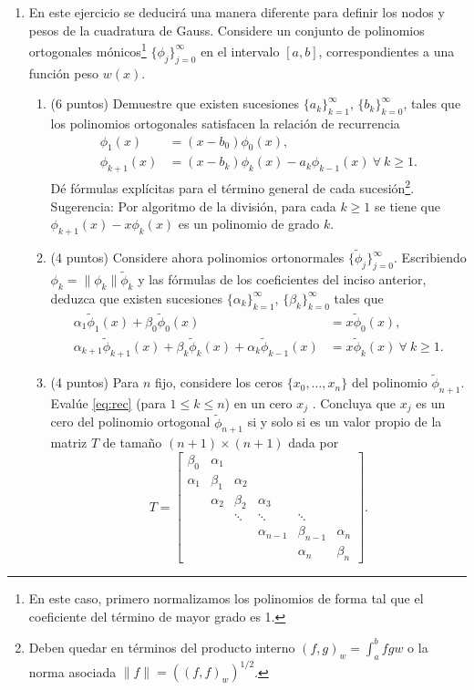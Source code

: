 \documentclass[12pt,final,twoside,notitlepage]{article}
\begin{document}
\begin{enumerate}
\item En este ejercicio se deducirá una manera diferente para definir los nodos y pesos de la cuadratura de Gauss. Considere un conjunto de polinomios ortogonales mónicos\footnote{En este caso, primero normalizamos los polinomios de forma tal que el coeficiente del término de mayor grado es 1.} $\lbrace \phi_j\rbrace_{j=0}^\infty$ en el intervalo $[a,b]$, correspondientes a una función peso $w(x)$.
\begin{enumerate}
    \item (6 puntos) Demuestre que existen sucesiones $\lbrace a_k\rbrace_{k=1}^\infty$, $\lbrace b_k\rbrace_{k=0}^\infty$, tales que los polinomios ortogonales satisfacen la relación de recurrencia 
\begin{align*}
\phi_1(x) &= (x-b_0)\phi_0(x),\\
\phi_{k+1}(x) &= (x-b_k)\phi_k(x) - a_k\phi_{k-1}(x)\ \forall\ k\geq 1. 
\end{align*}
Dé fórmulas explícitas para el término general de cada sucesión\footnote{Deben quedar en términos del producto interno $(f,g)_w = \int_a^b fgw$ o la norma asociada $\|f\|=((f,f)_w)^{1/2}$.}.
Sugerencia: Por algoritmo de la división, para cada $k\geq 1$ se tiene que $\phi_{k+1}(x)-x \phi_k(x)$ es un polinomio de grado $k$.
\item (4 puntos) Considere ahora polinomios ortonormales $\{\widetilde{\phi}_j\}_{j=0}^\infty$. Escribiendo $\phi_k = \|\phi_k\| \widetilde{\phi}_k$ y las fórmulas de los coeficientes del inciso anterior, deduzca que existen sucesiones $\lbrace \alpha_k\rbrace_{k=1}^\infty$, $\lbrace \beta_k\rbrace_{k=0}^\infty$ tales que  
\begin{align} \label{eq:rec}
\alpha_1\widetilde{\phi}_1(x) + \beta_0 \widetilde{\phi}_0(x) &= x \widetilde{\phi}_0(x),\nonumber \\
\alpha_{k+1}\widetilde{\phi}_{k+1}(x) + \beta_k \widetilde{\phi}_k(x) + \alpha_{k}\widetilde{\phi}_{k-1}(x) &= x \widetilde{\phi}_k(x)\ \forall\ k\geq 1. 
\end{align}

\item (4 puntos) Para $n$ fijo, considere los ceros $\{x_0,\ldots,x_n\}$ del polinomio $\widetilde{\phi}_{n+1}$. Evalúe \eqref{eq:rec} (para $1\leq k \leq n$) en un cero $x_j$ . Concluya que $x_j$ es un cero del polinomio ortogonal $\widetilde{\phi}_{n+1}$ si y solo si es un valor propio de la matriz $T$ de tamaño $(n+1)\times (n+1)$ dada por 
\begin{equation*} \label{eq:T}
T = \left[
\begin{array}{llllll}
\beta_0 & \alpha_1 &  &  &  &  \\ 
\alpha_1 & \beta_1 & \alpha_2 &  &  &  \\ 
 & \alpha_2 & \beta_2 & \alpha_3 &  &  \\ 
 &  & \ddots & \ddots & \ddots &  \\ 
 &  &  & \alpha_{n-1} & \beta_{n-1} & \alpha_{n} \\ 
 &  &  &  & \alpha_n & \beta_n
\end{array} 
\right].
\end{equation*}


\end{enumerate}
\end{enumerate}
\end{document}
